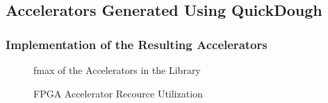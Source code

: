 \documentclass[accentcolor=tud1a,colorbacktitle,inverttitle,landscape,german,presentation,t]{tudbeamer}
\begin{document}
  \subsection{Accelerators Generated Using QuickDough}
  \begin{frame}
  \frametitle{Implementation of the Resulting Accelerators}
  \vspace{-1em}
  \begin{figure}[htb]
  \vspace{-0.6em}
  \caption{fmax of the Accelerators in the Library}
  \label{fig:impl-freq}
  \end{figure}
  \vspace{-0.5em}
  \begin{figure}[htb]
  \vspace{1em}
  \vspace{-0.6em}
  \caption{FPGA Accelerator Recource Utilization}
  \label{fig:hw-overhead}
  \end{figure}  
  \end{frame}
  
\end{document}
